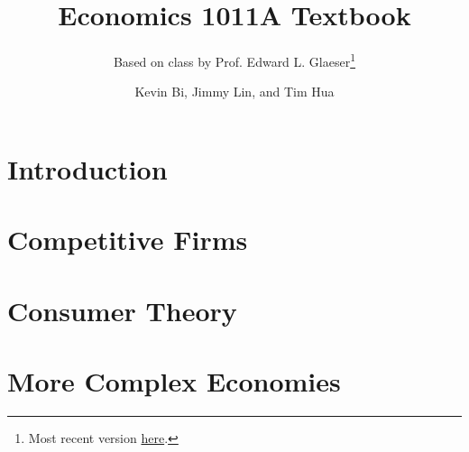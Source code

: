 \documentclass[12pt,twoside=false,openright,numbers=noenddot]{scrbook}
\title{Economics 1011A Textbook}
\subtitle{Based on class by Prof. Edward L. Glaeser\footnote{Most recent version \href{https://github.com/TheKeveloper/ECON-1011A-Textbook/blob/master/textbook.pdf}{here}.}}
\author{Kevin Bi, Jimmy Lin, and Tim Hua}
\begin{document}
\maketitle
\tableofcontents

\part{Introduction}




\part{Competitive Firms}



\part{Consumer Theory}





\part{More Complex Economies}





\end{document}
